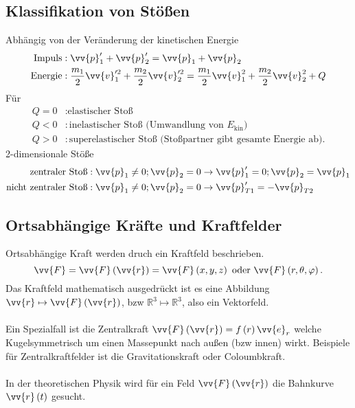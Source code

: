 \documentclass[a4paper,12pt]{article}
\begin{document}
\subsection{Klassifikation von Stößen}
Abhängig von der Veränderung der kinetischen Energie
\begin{align*}
        \text{Impuls}&:\vv{p}'_1+\vv{p}'_2=\vv{p}_1+\vv{p}_2\\
        \text{Energie}&:\dfrac{m_1}{2}\vv{v}'^2_1+\dfrac{m_2}{2}\vv{v}'^2_2=\dfrac{m_1}{2}\vv{v}^2_1+\dfrac{m_2}{2}\vv{v}^2_2+Q\\
\end{align*}
Für 
\begin{align*}
        Q=0&:\text{elastischer Stoß}\\
        Q<0&:\text{inelastischer Stoß (Umwandlung von $E_{\text{kin}}$)}\\
        Q>0&:\text{superelastischer Stoß (Stoßpartner gibt gesamte Energie ab)}
.\end{align*}
2-dimensionale Stöße
\begin{align*}
        \text{zentraler Stoß}&:\vv{p}_1\neq 0;\vv{p}_2=0\rightarrow \vv{p}'_1=0;\vv{p}_2=\vv{p}_1\\
        \text{nicht zentraler Stoß}&:\vv{p}_1\neq 0;\vv{p}_2=0\rightarrow \vv{p}'_{T1}=-\vv{p}_{T2}
\end{align*}

\subsection{Ortsabhängige Kräfte und Kraftfelder}
Ortsabhängige Kraft werden druch ein Kraftfeld beschrieben.
\[ 
        \vv{F}=\vv{F}\left(\vv{r}\right)=\vv{F}\left(x,y,z\right)\text{ oder }\vv{F}\left(r,\theta ,\varphi \right)
.\] 
Das Kraftfeld mathematisch ausgedrückt ist es eine Abbildung $\vv{r}\mapsto\vv{F}\left(\vv{r}\right)$, bzw $\mathbb{R}^{3}\mapsto\mathbb{R}^{3}$, also ein Vektorfeld.\\\\
Ein Spezialfall ist die Zentralkraft $\vv{F}\left(\vv{r}\right)=f\left(r\right)\vv{e}_r$ welche Kugelsymmetrisch um einen Massepunkt nach außen (bzw innen) wirkt. Beispiele für Zentralkraftfelder ist die Gravitationskraft oder Coloumbkraft.\\\\
In der theoretischen Physik wird für ein Feld $\vv{F}\left(\vv{r}\right)$ die Bahnkurve $\vv{r}\left(t\right)$ gesucht.
\end{document}
